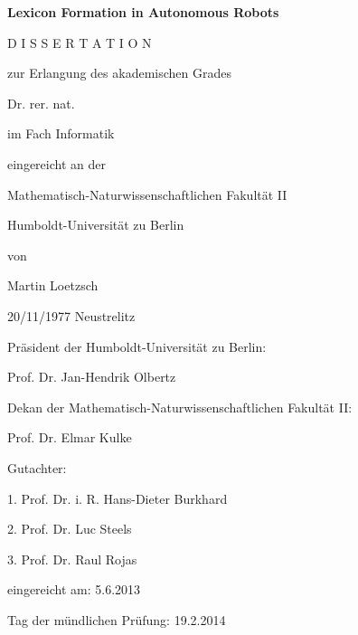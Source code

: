 

\sffamily

\centerline{\bfseries\Large Lexicon Formation in Autonomous Robots}

\vspace{1.5cm}

\large 
\centerline{D I S S E R T A T I O N}

\vspace{0.2cm}

\centerline{zur Erlangung des akademischen Grades}

\vspace{0.2cm}

\centerline{Dr. rer. nat.}
\centerline{im Fach Informatik}

\vspace{0.8cm}

\centerline{eingereicht an der}

\vspace{0.2cm}

\centerline{Mathematisch-Naturwissenschaftlichen Fakultät II}
\centerline{Humboldt-Universität zu Berlin}

\vspace{0.8cm}

\centerline{von}
\centerline{\sffamily Martin Loetzsch}
\centerline{20/11/1977 Neustrelitz}


\vspace{2cm}

\rmfamily

Präsident der Humboldt-Universität zu Berlin:

Prof. Dr. Jan-Hendrik Olbertz

\vspace{0.5cm}

Dekan der Mathematisch-Naturwissenschaftlichen Fakultät II:

Prof. Dr. Elmar Kulke

\vspace{0.5cm}


Gutachter:

1. Prof. Dr. i. R. Hans-Dieter Burkhard

2. Prof. Dr. Luc Steels

3. Prof. Dr. Raul Rojas


\vspace{0.5cm}

eingereicht am: 5.6.2013

Tag der mündlichen Prüfung: 19.2.2014

\normalsize

\cleardoublepage

